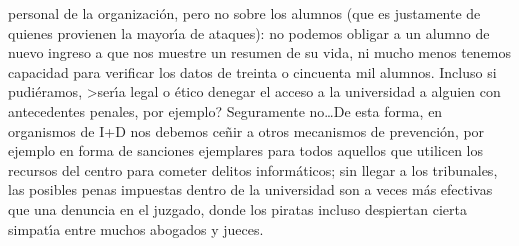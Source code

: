 personal de la organizaci\'on, pero no sobre los alumnos (que es justamente
de quienes provienen la mayor\'{\i}a de ataques): no podemos obligar a un
alumno de nuevo ingreso a que nos muestre un resumen de su vida, ni mucho menos
tenemos capacidad para verificar los datos de treinta o cincuenta mil alumnos.
Incluso si pudi\'eramos, >ser\'{\i}a legal o \'etico denegar el acceso a la
universidad a alguien con antecedentes penales, por ejemplo? Seguramente 
no\ldots De esta forma, en organismos de I+D nos debemos ce\~nir a otros
mecanismos de prevenci\'on, por ejemplo en forma de sanciones ejemplares para
todos aquellos que utilicen los recursos del centro para cometer delitos
inform\'aticos; sin llegar a los tribunales, las posibles penas
impuestas dentro de la universidad son a veces m\'as efectivas que una denuncia
en el juzgado, donde los piratas incluso despiertan cierta simpat\'{\i}a entre 
muchos abogados y jueces.
